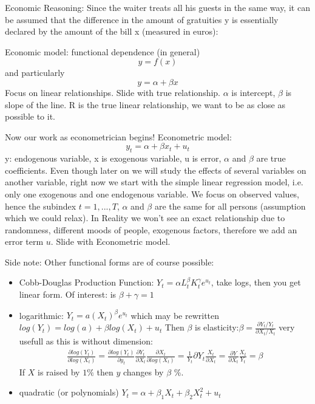 \documentclass{article}
\begin{document}
Economic Reasoning: Since the waiter treats all his guests in the same way, it can be assumed that the difference in the amount of gratuities y is essentially declared by the amount of the bill x (measured in euros):

Economic model: functional dependence (in general)
\[ y=f(x) \]
and particularly
\[ y=\alpha +\beta x \]
Focus on linear relationships. Slide with true relationship. $\alpha$ is intercept, $\beta$ is slope of the line. R is the true linear relationship, we want to be as close as possible to it.

Now our work as econometrician begins!
Econometric model:
\[ y_t=\alpha+ \beta x_t+u_t \]
y: endogenous variable, x is exogenous variable, u is error, $\alpha$ and $\beta$ are true coefficients. Even though later on we will study the effects of several variables on another variable, right now we start with the simple linear regression model, i.e. only one exogenous and one endogenous variable. We focus on observed values, hence the subindex $t=1,...,T$, $\alpha$ and $\beta$ are the same for all persons (assumption which we could relax). In Reality we won't see an exact relationship due to randomness, different moods of people, exogenous factors, therefore we add an error term $u$.
Slide with Econometric model.

Side note: Other functional forms are of course possible:
 \begin{itemize}
 	\item Cobb-Douglas Production Function: $Y_t = \alpha L_t^\beta K_t^\gamma e^{u_t}$, take logs, then you get linear form. Of interest: is $\beta+\gamma=1$
 	\item logarithmic: $Y_t = a(X_t)^\beta e^{u_t}$ which may be rewritten $log(Y_t) = log(a) + \beta log(X_t) + u_t$ Then $\beta$ is elasticity:$\beta = \frac{\partial Y_t / Y_t}{\partial X_t / X_t}$ very usefull as this is without dimension:
 	\begin{align*}
 	\frac{\partial log(Y_t)}{\partial log(X_t)} =  	\frac{\partial log(Y_t)}{\partial y_t}  	\frac{\partial Y_t}{\partial X_t}  	\frac{\partial X_t}{\partial log(X_t)} = \frac{1}{Y_t}\partial Y_t \frac{X_t}{\partial X_t} = \frac{\partial Y}{\partial X_t} \frac{X_t}{Y_t} = \beta
 	\end{align*}
 	If $X$ is raised by $1\%$ then $y$ changes by $\beta$ \%.
 	 	\item quadratic (or polynomials)
 	$ Y_t = \alpha + \beta_1 X_t + \beta_2 X_t^2 + u_t$
\end{itemize}
 
\end{document}
